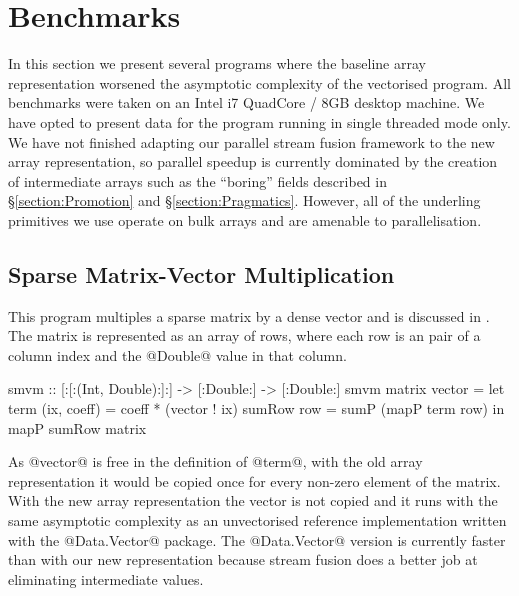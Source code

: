 
\clearpage{}
\section{Benchmarks}
\label{section:Benchmarks}
In this section we present several programs where the baseline array representation worsened the asymptotic complexity of the vectorised program. All benchmarks were taken on an Intel i7 QuadCore / 8GB desktop machine. We have opted to present data for the program running in single threaded mode only. We have not finished adapting our parallel stream fusion framework to the new array representation, so parallel speedup is currently dominated by the creation of intermediate arrays such as the ``boring'' fields described in \S\ref{section:Promotion} and \S\ref{section:Pragmatics}. However, all of the underling primitives we use operate on bulk arrays and are amenable to parallelisation. 


\subsection{Sparse Matrix-Vector Multiplication}
This program multiples a sparse matrix by a dense vector and is discussed in \cite{Leshchinskiy:higher-order-ndp}. The matrix is represented as an array of rows, where each row is an pair of a column index and the @Double@ value in that column.
%
\begin{small}
\begin{code}
smvm :: [:[:(Int, Double):]:] -> [:Double:] -> [:Double:]
smvm matrix vector
 = let term (ix, coeff) = coeff * (vector ! ix)
       sumRow row       = sumP (mapP term row)
   in  mapP sumRow matrix
\end{code}
\end{small}
%
As @vector@ is free in the definition of @term@, with the old array representation it would be copied once for every non-zero element of the matrix. With the new array representation the vector is not copied and it runs with the same asymptotic complexity as an unvectorised reference implementation written with the @Data.Vector@ package. The @Data.Vector@ version is currently faster than with our new representation because stream fusion \cite{Coutts:streamfusion} does a better job at eliminating intermediate values.


